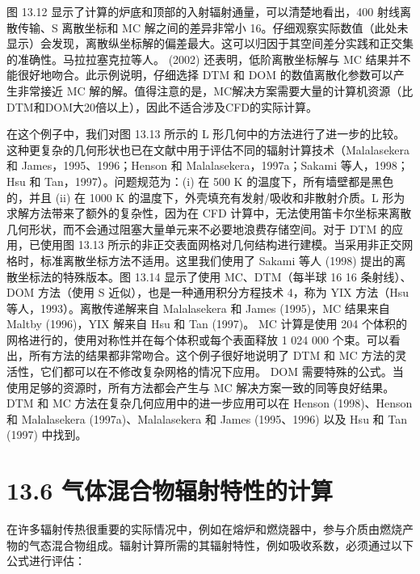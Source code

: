 \documentclass[11pt,a4paper,openany,fontset=none]{ctexbook}
\begin{document}
图 13.12 显示了计算的炉底和顶部的入射辐射通量，可以清楚地看出，400 射线离散传输、S 离散坐标和 MC 解之间的差异非常小 16。仔细观察实际数值（此处未显示）会发现，离散纵坐标解的偏差最大。这可以归因于其空间差分实践和正交集的准确性。马拉拉塞克拉等人。 (2002) 还表明，低阶离散坐标解与 MC 结果并不能很好地吻合。此示例说明，仔细选择 DTM 和 DOM 的数值离散化参数可以产生非常接近 MC 解的解。值得注意的是，MC解决方案需要大量的计算机资源（比DTM和DOM大20倍以上），因此不适合涉及CFD的实际计算。

在这个例子中，我们对图 13.13 所示的 L 形几何中的方法进行了进一步的比较。这种更复杂的几何形状也已在文献中用于评估不同的辐射计算技术（Malalasekera 和 James，1995、1996；Henson 和 Malalasekera，1997a；Sakami 等人，1998；Hsu 和 Tan，1997）。问题规范为：(i) 在 500 K 的温度下，所有墙壁都是黑色的，并且 (ii) 在 1000 K 的温度下，外壳填充有发射/吸收和非散射介质。L 形为求解方法带来了额外的复杂性，因为在 CFD 计算中，无法使用笛卡尔坐标来离散几何形状，而不会通过阻塞大量单元来不必要地浪费存储空间。对于 DTM 的应用，已使用图 13.13 所示的非正交表面网格对几何结构进行建模。当采用非正交网格时，标准离散坐标方法不适用。这里我们使用了 Sakami 等人 (1998) 提出的离散坐标法的特殊版本。图 13.14 显示了使用 MC、DTM（每半球 16 16 条射线）、DOM 方法（使用
S 近似），也是一种通用积分方程技术 4，称为 YIX 方法（Hsu 等人，1993）。离散传递解来自 Malalasekera 和 James (1995)，MC 结果来自 Maltby (1996)，YIX 解来自 Hsu 和 Tan (1997)。 MC 计算是使用 204 个体积的网格进行的，使用对称性并在每个体积或每个表面释放 1 024 000 个束。可以看出，所有方法的结果都非常吻合。这个例子很好地说明了 DTM 和 MC 方法的灵活性，它们都可以在不修改复杂网格的情况下应用。 DOM 需要特殊的公式。当使用足够的资源时，所有方法都会产生与 MC 解决方案一致的同等良好结果。 DTM 和 MC 方法在复杂几何应用中的进一步应用可以在 Henson (1998)、Henson 和 Malalasekera (1997a)、Malalasekera 和 James (1995、1996) 以及 Hsu 和 Tan (1997) 中找到。

\section*{13.6 气体混合物辐射特性的计算}

在许多辐射传热很重要的实际情况中，例如在熔炉和燃烧器中，参与介质由燃烧产物的气态混合物组成。辐射计算所需的其辐射特性，例如吸收系数，必须通过以下公式进行评估：
\end{document}
